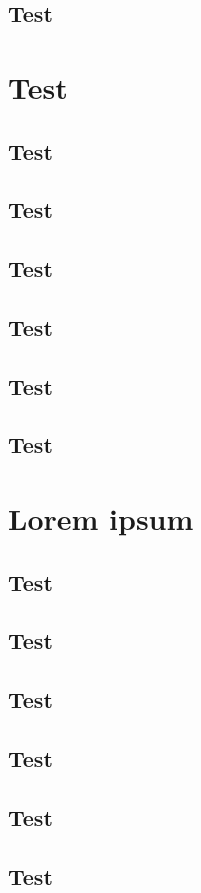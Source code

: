 \documentclass[b5paper]{scrbook}
\begin{document}
\subsection{Test}
\section{Test}
\subsection{Test}
\subsection{Test}
\subsection{Test}
\subsection{Test}
\subsection{Test}
\subsection{Test}

\section{Lorem ipsum}
\lipsum

\subsection{Test}
\subsection{Test}
\subsection{Test}
\subsection{Test}
\subsection{Test}
\subsection{Test}
\end{document}

